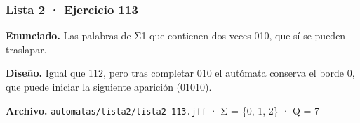 
\hypertarget{lista-2-ejercicio-113}{%
\subsubsection{Lista 2 · Ejercicio 113}\label{lista-2-ejercicio-113}}

\textbf{Enunciado.} Las palabras de Σ1 que contienen dos veces 010, que sí se pueden traslapar.

\textbf{Diseño.} Igual que 112, pero tras completar 010 el autómata conserva el borde 0, que puede iniciar la siguiente aparición (01010).

\textbf{Archivo.} \texttt{automatas/lista2/lista2-113.jff} · Σ = \{0, 1, 2\} · \textbar Q\textbar{} = 7


